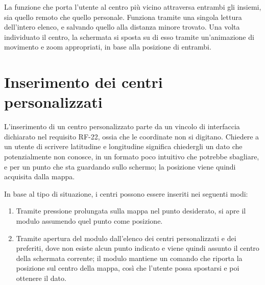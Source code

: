 La funzione che porta l'utente al centro più vicino attraversa entrambi gli insiemi, sia quello remoto che quello personale. %
Funziona tramite una singola lettura dell'intero elenco, e salvando quello alla distanza minore trovato.
Una volta individuato il centro, la schermata si sposta su di esso tramite un'animazione di movimento e zoom appropriati,
in base alla posizione di entrambi.
%
%

\section{Inserimento dei centri personalizzati}\label{subsec:impl-validazione}

L'inserimento di un centro personalizzato parte da un vincolo di interfaccia dichiarato nel requisito RF-22, ossia che le coordinate non si digitano.
Chiedere a un utente di scrivere latitudine e longitudine significa chiedergli un dato che potenzialmente non conosce, in un formato poco intuitivo
che potrebbe sbagliare, e per un punto che sta guardando sullo schermo; la posizione viene quindi acquisita dalla mappa.

In base al tipo di situazione, i centri possono essere inseriti nei seguenti modi:

\begin{enumerate}
  \item Tramite pressione prolungata sulla mappa nel punto desiderato, si apre il modulo assumendo quel punto come posizione.%
  \item Tramite apertura del modulo dall'elenco dei centri personalizzati e dei preferiti, dove non esiste alcun punto indicato e viene quindi assunto
  il centro della schermata corrente; il modulo mantiene un comando che riporta la posizione sul centro della mappa, così che
  l'utente possa spostarsi e poi ottenere il dato.
\end{enumerate}

